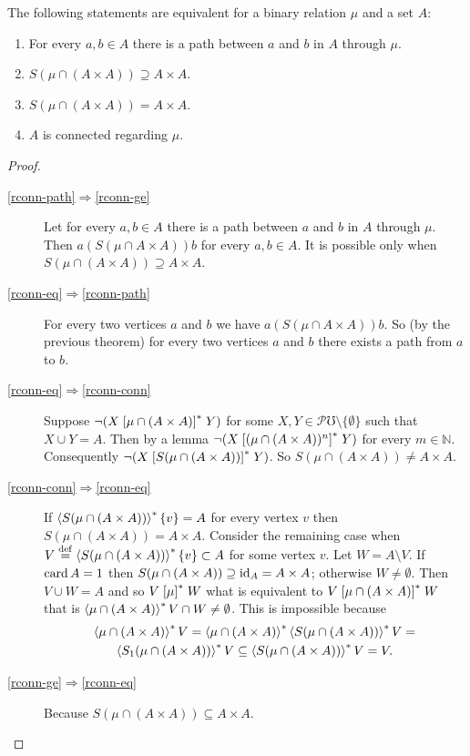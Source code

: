 \begin{thm}
The following statements are equivalent for a binary relation $\mu$
and a set $A$:
\begin{enumerate}
\item \label{rconn-path}For every $a,b\in A$ there is a path between $a$
and $b$ in $A$ through $\mu$.
\item \label{rconn-ge}$S(\mu\cap(A\times A))\supseteq A\times A$.
\item \label{rconn-eq}$S(\mu\cap(A\times A))=A\times A$.
\item \label{rconn-conn}$A$ is connected regarding $\mu$.
\end{enumerate}
\end{thm}
\begin{proof}
~
\begin{description}
\item [{\ref{rconn-path}$\Rightarrow$\ref{rconn-ge}}] Let for every
$a,b\in A$ there is a path between $a$ and $b$ in $A$ through
$\mu$. Then $a\mathrel{(S(\mu\cap A\times A))}b$ for every $a,b\in A$.
It is possible only when $S(\mu\cap(A\times A))\supseteq A\times A$.
\item [{\ref{rconn-eq}$\Rightarrow$\ref{rconn-path}}] For every two
vertices $a$ and $b$ we have $a\mathrel{(S(\mu\cap A\times A))}b$.
So (by the previous theorem) for every two vertices $a$ and $b$
there exists a path from $a$ to $b$.
\item [{\ref{rconn-eq}$\Rightarrow$\ref{rconn-conn}}] Suppose $\lnot(X\mathrel{\left[\mu\cap(A\times A)\right]^{\ast}}Y)$
for some $X,Y\in\mathscr{P}\mho\setminus\{\emptyset\}$ such that
$X\cup Y=A$. Then by a lemma $\lnot(X\mathrel{\left[(\mu\cap(A\times A))^{n}\right]^{\ast}}Y)$
for every $m\in\mathbb{N}$. Consequently $\lnot(X\mathrel{\left[S(\mu\cap(A\times A))\right]^{\ast}}Y)$.
So $S(\mu\cap(A\times A))\ne A\times A$.
\item [{\ref{rconn-conn}$\Rightarrow$\ref{rconn-eq}}] If $\left\langle S(\mu\cap(A\times A))\right\rangle ^{\ast}\{v\}=A$
for every vertex $v$ then $S(\mu\cap(A\times A))=A\times A$. Consider
the remaining case when $V\overset{\mathrm{def}}{=}\left\langle S(\mu\cap(A\times A))\right\rangle ^{\ast}\{v\}\subset A$
for some vertex $v$. Let $W=A\setminus V$. If $\operatorname{card} A=1$ then
$S(\mu\cap(A\times A))\supseteq\operatorname{id}_{A}=A\times A$; otherwise $W\neq\emptyset$.
Then $V\cup W=A$ and so $V\mathrel{\left[\mu\right]^{\ast}}W$ what is equivalent to
$V\mathrel{\left[\mu\cap(A\times A)\right]^{\ast}}W$ that is $\left\langle \mu\cap(A\times A)\right\rangle ^{\ast}V\cap W\ne\emptyset$.
This is impossible because 
\begin{multline*}
\left\langle \mu\cap(A\times A)\right\rangle ^{\ast}V=\left\langle \mu\cap(A\times A)\right\rangle ^{\ast}\left\langle S(\mu\cap(A\times A))\right\rangle ^{\ast}V=\\
\left\langle S_{1}(\mu\cap(A\times A))\right\rangle ^{\ast}V\subseteq\left\langle S(\mu\cap(A\times A))\right\rangle ^{\ast}V=V.
\end{multline*}

\item [{\ref{rconn-ge}$\Rightarrow$\ref{rconn-eq}}] Because $S(\mu\cap(A\times A))\subseteq A\times A$.
\end{description}
\end{proof}
